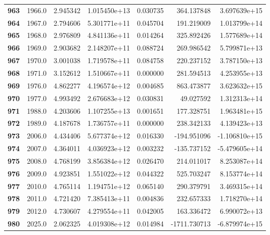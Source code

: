 \documentclass{report}[12pt]
\begin{document}
\begin{center}
\begin{tabular}{lrrrrrr}
\textbf{963 } &         1966.0 &   2.945342 &  1.015450e+13 &    0.030735 &   364.137848 &  3.697639e+15 \\
\textbf{964 } &         1967.0 &   2.794606 &  5.301771e+11 &    0.045704 &   191.219009 &  1.013799e+14 \\
\textbf{965 } &         1968.0 &   2.976809 &  4.841136e+11 &    0.014264 &   325.892426 &  1.577689e+14 \\
\textbf{966 } &         1969.0 &   2.903682 &  2.148207e+11 &    0.088724 &   269.986542 &  5.799871e+13 \\
\textbf{967 } &         1970.0 &   3.001038 &  1.719578e+11 &    0.084758 &   220.237152 &  3.787150e+13 \\
\textbf{968 } &         1971.0 &   3.152612 &  1.510667e+11 &    0.000000 &   281.594513 &  4.253955e+13 \\
\textbf{969 } &         1976.0 &   4.862277 &  4.196574e+12 &    0.004685 &   863.473877 &  3.623632e+15 \\
\textbf{970 } &         1977.0 &   4.993492 &  2.676683e+12 &    0.030831 &    49.027592 &  1.312313e+14 \\
\textbf{971 } &         1988.0 &   4.203606 &  1.107255e+13 &    0.001651 &   177.328751 &  1.963481e+15 \\
\textbf{972 } &         1989.0 &   4.187678 &  1.736757e+11 &    0.000000 &   238.342133 &  4.139423e+13 \\
\textbf{973 } &         2006.0 &   4.434406 &  5.677374e+12 &    0.016330 &  -194.951096 & -1.106810e+15 \\
\textbf{974 } &         2007.0 &   4.364011 &  4.036923e+12 &    0.003232 &  -135.737152 & -5.479605e+14 \\
\textbf{975 } &         2008.0 &   4.768199 &  3.856384e+12 &    0.026470 &   214.011017 &  8.253087e+14 \\
\textbf{976 } &         2009.0 &   4.923851 &  1.551022e+12 &    0.044322 &   525.703247 &  8.153774e+14 \\
\textbf{977 } &         2010.0 &   4.765114 &  1.194751e+12 &    0.065140 &   290.379791 &  3.469315e+14 \\
\textbf{978 } &         2011.0 &   4.721420 &  7.385413e+11 &    0.004836 &   232.657333 &  1.718270e+14 \\
\textbf{979 } &         2012.0 &   4.730607 &  4.279554e+11 &    0.042005 &   163.336472 &  6.990072e+13 \\
\textbf{980 } &         2025.0 &   2.062325 &  4.019308e+12 &    0.014984 & -1711.730713 & -6.879974e+15 \\

\end{tabular}
\end{center}
\end{document}
